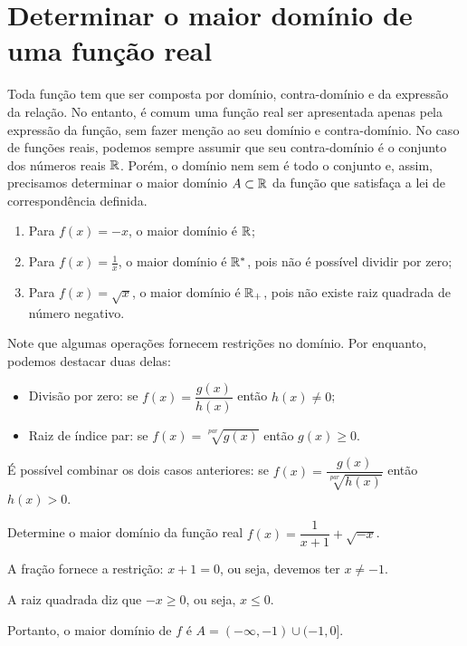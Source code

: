 

\section{Determinar o maior domínio de uma função real}

Toda função tem que ser composta por domínio, contra-domínio e da expressão da relação. No entanto, é comum uma função real ser apresentada apenas pela expressão da função, sem fazer menção ao seu domínio e contra-domínio. No caso de funções reais, podemos sempre assumir que seu contra-domínio é o conjunto dos números reais $\mathbb{R}$. Porém, o domínio nem sem é todo o conjunto e, assim, precisamos determinar o maior domínio $A\subset \mathbb{R}$ da função que satisfaça a lei de correspondência definida.

\begin{exem}\hfill
    \begin{enumerate}
        \item Para $f(x)=-x$, o maior domínio é $\mathbb{R}$;
        \item Para $f(x)=\frac{1}{x}$, o maior domínio é $\mathbb{R}^{*}$, pois não é possível dividir por zero;
        \item Para $f(x)=\sqrt{x}$, o maior domínio é $\mathbb{R}_{+}$, pois não existe raiz quadrada de número negativo.
    \end{enumerate}
\end{exem}

Note que algumas operações fornecem restrições no domínio. Por enquanto, podemos destacar duas delas:
\begin{itemize}
    \item Divisão por zero: se $f(x)=\dfrac{g(x)}{h(x)}$ então $h(x)\neq 0$;
    \item Raiz de índice par: se $f(x)=\sqrt[par]{g(x)}$ então $g(x)\geq 0$.
\end{itemize}

É possível combinar os dois casos anteriores: se $f(x)=\dfrac{g(x)}{\sqrt[par]{h(x)}}$ então $h(x)> 0$.

\begin{exem}
    Determine o maior domínio da função real $f(x)=\dfrac{1}{x+1}+\sqrt{-x}$.

    A fração fornece a restrição: $x+1= 0$, ou seja, devemos ter $x\neq -1$.

    A raiz quadrada diz que $-x\geq 0$, ou seja, $x\leq 0$.

    Portanto, o maior domínio de $f$ é $A=(-\infty,-1)\cup(-1,0]$.
\end{exem}

